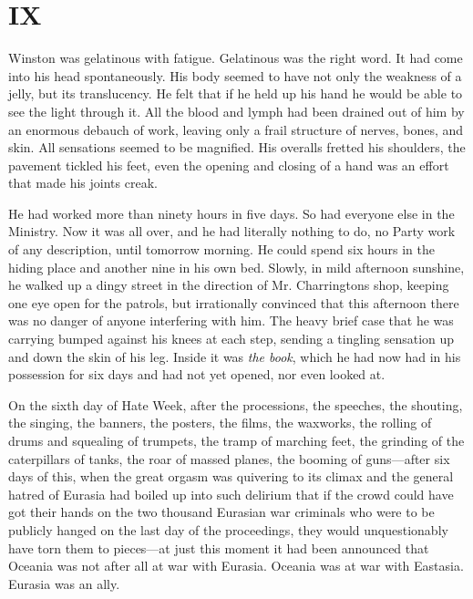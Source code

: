 \section{IX}\label{ix}

Winston was gelatinous with fatigue. Gelatinous was the right word. It
had come into his head spontaneously. His body seemed to have not only
the weakness of a jelly, but its translucency. He felt that if he held
up his hand he would be able to see the light through it. All the blood
and lymph had been drained out of him by an enormous debauch of work,
leaving only a frail structure of nerves, bones, and skin. All
sensations seemed to be magnified. His overalls fretted his shoulders,
the pavement tickled his feet, even the opening and closing of a hand
was an effort that made his joints creak.

He had worked more than ninety hours in five days. So had everyone else
in the Ministry. Now it was all over, and he had literally nothing to
do, no Party work of any description, until tomorrow morning. He could
spend six hours in the hiding place and another nine in his own bed.
Slowly, in mild afternoon sunshine, he walked up a dingy street in the
direction of Mr. Charrington\textquotesingle s shop, keeping one eye
open for the patrols, but irrationally convinced that this afternoon
there was no danger of anyone interfering with him. The heavy brief case
that he was carrying bumped against his knees at each step, sending a
tingling sensation up and down the skin of his leg. Inside it was
\emph{the book}, which he had now had in his possession for six days and
had not yet opened, nor even looked at.

On the sixth day of Hate Week, after the processions, the speeches, the
shouting, the singing, the banners, the posters, the films, the
waxworks, the rolling of drums and squealing of trumpets, the tramp of
marching feet, the grinding of the caterpillars of tanks, the roar of
massed planes, the booming of guns---after six days of this, when the
great orgasm was quivering to its climax and the general hatred of
Eurasia had boiled up into such delirium that if the crowd could have
got their hands on the two thousand Eurasian war criminals who were to
be publicly hanged on the last day of the proceedings, they would
unquestionably have torn them to pieces---at just this moment it had
been announced that Oceania was not after all at war with Eurasia.
Oceania was at war with Eastasia. Eurasia was an ally.

